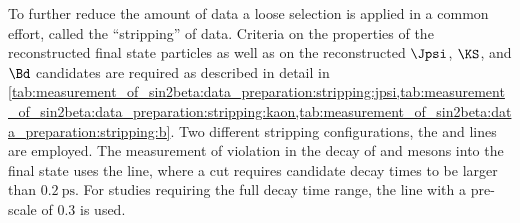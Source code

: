 To further reduce the amount of data a loose selection is applied in a common
effort, called the \enquote{stripping} of data. Criteria on the properties of
the reconstructed final state particles as well as on the reconstructed $\Jpsi$,
$\KS$, and $\Bd$ candidates are required as described in detail in 
\cref{tab:measurement_of_sin2beta:data_preparation:stripping:jpsi,tab:measurement_of_sin2beta:data_preparation:stripping:kaon,tab:measurement_of_sin2beta:data_preparation:stripping:b}. 
Two different stripping configurations, the \StrippingDetached and
\StrippingPrescaled lines are employed. The measurement of \CP violation in the
decay of \Bd and \Bdbar mesons into the \Jpsi\KS final state uses the
\StrippingDetached line, where a cut requires \Bd candidate decay times to be
larger than $\SI{0.2}{\pico\second}$. For studies requiring the full decay time
range, the \StrippingPrescaled line with a pre-scale of $\num{0.3}$ is used.

